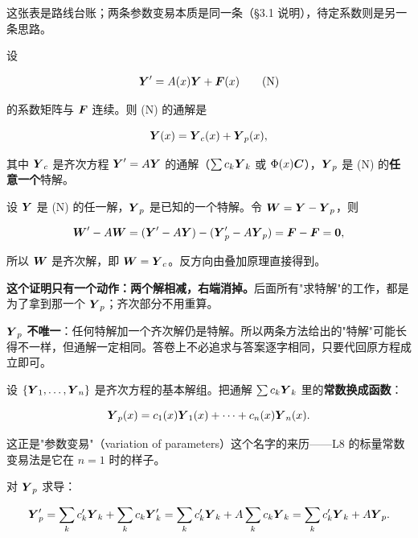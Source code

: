 \documentclass[11pt]{ctexart}
\begin{document}
这张表是路线台账；两条参数变易本质是同一条（§3.1 说明），待定系数则是另一条思路。



设

\[
\boldsymbol{Y}'=A(x)\boldsymbol{Y}+\boldsymbol{F}(x)\tag{N}
\]

的系数矩阵与 $\boldsymbol{F}$ 连续。则 (N) 的通解是

\[
\boldsymbol{Y}(x)=\boldsymbol{Y}_c(x)+\boldsymbol{Y}_p(x),
\]

其中 $\boldsymbol{Y}_c$ 是齐次方程 $\boldsymbol{Y}'=A\boldsymbol{Y}$ 的通解（$\sum c_k\boldsymbol{Y}_k$ 或 $\Phi(x)\boldsymbol{C}$），$\boldsymbol{Y}_p$ 是 (N) 的\textbf{任意一个}特解。


设 $\boldsymbol{Y}$ 是 (N) 的任一解，$\boldsymbol{Y}_p$ 是已知的一个特解。令 $\boldsymbol{W}=\boldsymbol{Y}-\boldsymbol{Y}_p$，则

\[
\boldsymbol{W}'-A\boldsymbol{W}=(\boldsymbol{Y}'-A\boldsymbol{Y})-(\boldsymbol{Y}_p'-A\boldsymbol{Y}_p)=\boldsymbol{F}-\boldsymbol{F}=\boldsymbol{0},
\]

所以 $\boldsymbol{W}$ 是齐次解，即 $\boldsymbol{W}=\boldsymbol{Y}_c$。反方向由叠加原理直接得到。

\textbf{这个证明只有一个动作：两个解相减，右端消掉。}后面所有"求特解"的工作，都是为了拿到那一个 $\boldsymbol{Y}_p$；齐次部分不用重算。


$\boldsymbol{Y}_p$ \textbf{不唯一}：任何特解加一个齐次解仍是特解。所以两条方法给出的"特解"可能长得不一样，但通解一定相同。答卷上不必追求与答案逐字相同，只要代回原方程成立即可。



设 $\{\boldsymbol{Y}_1,\dots,\boldsymbol{Y}_n\}$ 是齐次方程的基本解组。把通解 $\sum c_k\boldsymbol{Y}_k$ 里的\textbf{常数换成函数}：

\[
\boldsymbol{Y}_p(x)=c_1(x)\boldsymbol{Y}_1(x)+\cdots+c_n(x)\boldsymbol{Y}_n(x).
\]

这正是"参数变易"（variation of parameters）这个名字的来历——L8 的标量常数变易法是它在 $n=1$ 时的样子。


对 $\boldsymbol{Y}_p$ 求导：

\[
\boldsymbol{Y}_p'=\sum_k c_k'\boldsymbol{Y}_k+\sum_k c_k\boldsymbol{Y}_k'
=\sum_k c_k'\boldsymbol{Y}_k+A\sum_k c_k\boldsymbol{Y}_k
=\sum_k c_k'\boldsymbol{Y}_k+A\boldsymbol{Y}_p .
\]
\end{document}
